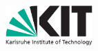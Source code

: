 \begin{center}
\vspace{.15\textwidth}


% 
% 
\includegraphics[width=0.25\textwidth]{Kitlogo_en_cmyk.pdf}
\end{center}
\rmfamily